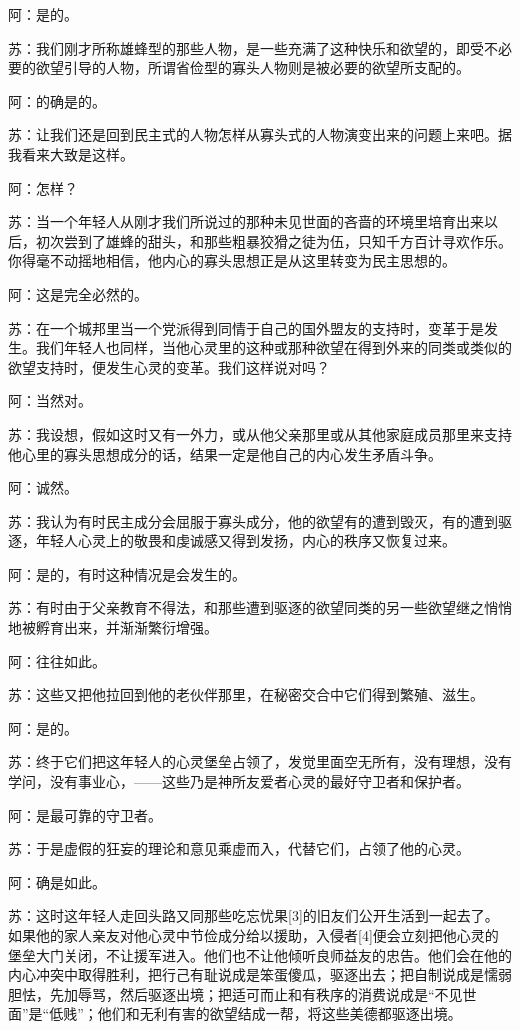 \documentclass[12pt,oneside]{book}
\begin{document}
阿：是的。

苏：我们刚才所称雄蜂型的那些人物，是一些充满了这种快乐和欲望的，即受不必要的欲望引导的人物，所谓省俭型的寡头人物则是被必要的欲望所支配的。

阿：的确是的。

苏：让我们还是回到民主式的人物怎样从寡头式的人物演变出来的问题上来吧。据我看来大致是这样。

阿：怎样？

苏：当一个年轻人从刚才我们所说过的那种未见世面的吝啬的环境里培育出来以后，初次尝到了雄蜂的甜头，和那些粗暴狡猾之徒为伍，只知千方百计寻欢作乐。你得毫不动摇地相信，他内心的寡头思想正是从这里转变为民主思想的。

阿：这是完全必然的。

苏：在一个城邦里当一个党派得到同情于自己的国外盟友的支持时，变革于是发生。我们年轻人也同样，当他心灵里的这种或那种欲望在得到外来的同类或类似的欲望支持时，便发生心灵的变革。我们这样说对吗？

阿：当然对。

苏：我设想，假如这时又有一外力，或从他父亲那里或从其他家庭成员那里来支持他心里的寡头思想成分的话，结果一定是他自己的内心发生矛盾斗争。

阿：诚然。

苏：我认为有时民主成分会屈服于寡头成分，他的欲望有的遭到毁灭，有的遭到驱逐，年轻人心灵上的敬畏和虔诚感又得到发扬，内心的秩序又恢复过来。

阿：是的，有时这种情况是会发生的。

苏：有时由于父亲教育不得法，和那些遭到驱逐的欲望同类的另一些欲望继之悄悄地被孵育出来，并渐渐繁衍增强。

阿：往往如此。

苏：这些又把他拉回到他的老伙伴那里，在秘密交合中它们得到繁殖、滋生。

阿：是的。

苏：终于它们把这年轻人的心灵堡垒占领了，发觉里面空无所有，没有理想，没有学问，没有事业心，——这些乃是神所友爱者心灵的最好守卫者和保护者。

阿：是最可靠的守卫者。

苏：于是虚假的狂妄的理论和意见乘虚而入，代替它们，占领了他的心灵。

阿：确是如此。

苏：这时这年轻人走回头路又同那些吃忘忧果[3]的旧友们公开生活到一起去了。如果他的家人亲友对他心灵中节俭成分给以援助，入侵者[4]便会立刻把他心灵的堡垒大门关闭，不让援军进入。他们也不让他倾听良师益友的忠告。他们会在他的内心冲突中取得胜利，把行己有耻说成是笨蛋傻瓜，驱逐出去；把自制说成是懦弱胆怯，先加辱骂，然后驱逐出境；把适可而止和有秩序的消费说成是“不见世面”是“低贱”；他们和无利有害的欲望结成一帮，将这些美德都驱逐出境。
\end{document}
